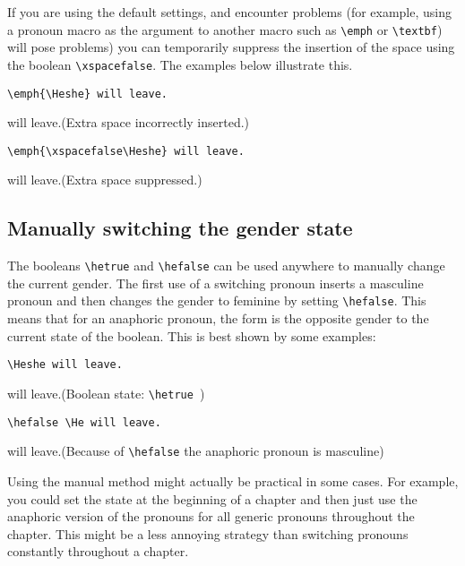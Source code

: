 \documentclass[11pt]{article}
\newcommand*\bs{\textbackslash}
\newcommand*{\pkg}[1]{\texttt{#1}\xspace}
\begin{document}
If you are using the default settings, and encounter problems (for example, using a pronoun macro as the argument to another macro such as \pkg{\bs emph} or \pkg{\bs textbf}) will pose problems) you can temporarily suppress the insertion of the space using the boolean \pkg{\bs xspacefalse}. The examples below illustrate this.

\begin{exe}
\ex\label{xspaces}
\begin{xlist}
\ex \begin{lstlisting}
\emph{\Heshe} will leave.
\end{lstlisting}
\ex \emph{\Heshe} will leave.\hfill(Extra space incorrectly inserted.)
\ex\begin{lstlisting}
\emph{\xspacefalse\Heshe} will leave.
\end{lstlisting}
\ex \emph{\hetrue\xspacefalse\Heshe} will leave.\hfill(Extra space suppressed.)
\end{xlist}
\end{exe}
\subsection{Manually switching the gender state}
The booleans \pkg{\bs hetrue} and \pkg{\bs hefalse} can be used anywhere to manually change the current gender. The first use of a switching pronoun inserts a masculine pronoun and then changes the gender to feminine by setting \pkg{\bs hefalse}. This means that for an anaphoric pronoun, the form is the opposite gender to the current state of the boolean.  This is best shown by some examples:

\begin{exe}
\ex\label{booleans}
\begin{xlist}
\ex \begin{lstlisting}
\Heshe will leave.
\end{lstlisting}
\ex \hefalse\Heshe will leave.\hfill(Boolean state: \pkg{\bs hetrue })
\ex\begin{lstlisting}
\hefalse \He will leave.
\end{lstlisting}
\ex \hefalse \He will leave.\hfill(Because of \pkg{\bs hefalse} the anaphoric pronoun is masculine)
\end{xlist}
\end{exe}

Using the manual method might actually be practical in some cases.  For example, you could set the state at the beginning of a chapter and then just use the anaphoric version of the pronouns for all generic pronouns throughout the chapter.  This might be a less annoying strategy than switching pronouns constantly throughout a chapter.
\end{document}
